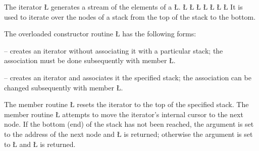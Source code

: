 \documentclass[openright,twoside]{report}
\begin{document}
The iterator \LGinlinetrue\LGbegin\lgrinde\L{}\endlgrinde\LGend{} generates a stream of the elements of a \LGinlinetrue\LGbegin\lgrinde\L{}\endlgrinde\LGend{}.
\LGinlinefalse\LGbegin\lgrinde
\L{}
\L{}
\L{\LB{}}
\L{\LB{}}
\L{\LB{}}
\L{\LB{}}
\L{\LB{\};}}
\endlgrinde\LGend
{}%
%
It is used to iterate over the nodes of a stack from the top of the stack to the bottom.

The overloaded constructor routine \LGinlinetrue\LGbegin\lgrinde\L{}\endlgrinde\LGend{} has the following forms:
\begin{prefix}
\item[\LGinlinetrue\LGbegin\lgrinde\L{\LB{\V{uStackIter}()}}\endlgrinde\LGend{}]
-- creates an iterator without associating it with a particular stack;
the association must be done subsequently with member \LGinlinetrue\LGbegin\lgrinde\L{}\endlgrinde\LGend{}.

\item[\LGinlinetrue\LGbegin\lgrinde\L{\LB{\V{uStackIter}(\0\K{const}\0\V{uStack}\<\V{T}\>\0\&\0\V{s}\0)}}\endlgrinde\LGend{}]
-- creates an iterator and associates it the specified stack;
the association can be changed subsequently with member \LGinlinetrue\LGbegin\lgrinde\L{}\endlgrinde\LGend{}.
\end{prefix}

The member routine \LGinlinetrue\LGbegin\lgrinde\L{}\endlgrinde\LGend{} resets the iterator to the top of the specified stack.
The member routine \LGinlinetrue\LGbegin\lgrinde\L{\LB{\>\>}}\endlgrinde\LGend{} attempts to move the iterator's internal cursor to the next node.
If the bottom (end) of the stack has not been reached, the argument is set to the address of the next node and \LGinlinetrue\LGbegin\lgrinde\L{}\endlgrinde\LGend{} is returned;
otherwise the argument is set to \LGinlinetrue\LGbegin\lgrinde\L{}\endlgrinde\LGend{} and \LGinlinetrue\LGbegin\lgrinde\L{}\endlgrinde\LGend{} is returned.
\end{document}
